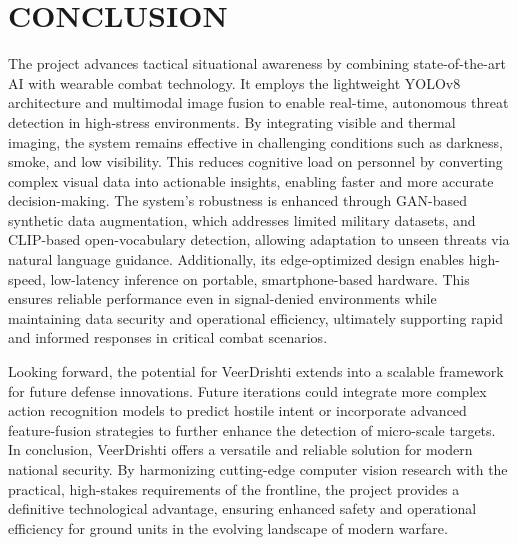\chapter{CONCLUSION}\label{ch:conclusion}
The project advances tactical situational awareness by combining state-of-the-art AI with wearable
combat technology. It employs the lightweight YOLOv8 architecture and multimodal image fusion to
enable real-time, autonomous threat detection in high-stress environments. By integrating visible
and thermal imaging, the system remains effective in challenging conditions such as darkness, smoke,
and low visibility. This reduces cognitive load on personnel by converting complex visual data into
actionable insights, enabling faster and more accurate decision-making. The system’s robustness is
enhanced through GAN-based synthetic data augmentation, which addresses limited military datasets,
and CLIP-based open-vocabulary detection, allowing adaptation to unseen threats via natural language
guidance. Additionally, its edge-optimized design enables high-speed, low-latency inference on
portable, smartphone-based hardware. This ensures reliable performance even in signal-denied
environments while maintaining data security and operational efficiency, ultimately supporting rapid
and informed responses in critical combat scenarios. \vspace{6pt}

Looking forward, the potential for VeerDrishti extends into a scalable framework for future defense
innovations. Future iterations could integrate more complex action recognition models to predict
hostile intent or incorporate advanced feature-fusion strategies to further enhance the detection of
micro-scale targets. In conclusion, VeerDrishti offers a versatile and reliable solution for modern
national security. By harmonizing cutting-edge computer vision research with the practical,
high-stakes requirements of the frontline, the project provides a definitive technological
advantage, ensuring enhanced safety and operational efficiency for ground units in the evolving
landscape of modern warfare.
\label{end:conclusion}
